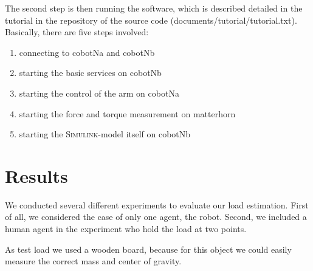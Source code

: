 The second step is then running the software, which is described detailed in the tutorial in the repository of the source code (documents/tutorial/tutorial.txt). Basically, there are five steps involved:
\begin{enumerate}
	\item connecting to cobotNa and cobotNb
	\item starting the basic services on cobotNb
	\item starting the control of the arm on cobotNa
	\item starting the force and torque measurement on matterhorn
	\item starting the \textsc{Simulink}-model itself on cobotNb
\end{enumerate}

\section{Results}

We conducted several different experiments to evaluate our load estimation. First of all, we considered the case of only one agent, the robot. Second, we included a human agent in the experiment who hold the load at two points.

As test load we used a wooden board, because for this object we could easily measure the correct mass and center of gravity.

